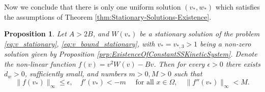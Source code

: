 \documentclass[preprint,12pt]{elsarticle}
\theoremstyle{plain}
\newtheorem{prp}{Proposition}[section]
\theoremstyle{definition}
\theoremstyle{remark}
\begin{document}
Now we conclude that there is only one uniform solution $(v_*, w_*)$ which satisfies the assumptions of Theorem \ref{thm:Stationary-Solutions-Existence}.

\begin{prp}
    \label{prp:nonlinearity_f_properties_at_v_star}
    Let $A > 2B$, and $W(v_*)$ be a stationary solution of the problem \eqref{eq:v_stationary}, \eqref{eq:v_bound_stationary}, with $v_* = v_{*, 3} > 1$ being a non-zero solution given by Proposition \ref{prp:ExistenceOfConstantSSKineticSystem}. Denote the non-linear function $f(v) = v^2W(v) - Bv$. Then for every $\epsilon > 0$ there exists $d_w > 0$, sufficiently small, and numbers $m > 0, M >0$ such that
    \begin{equation}
        \label{eq:nonlinearity_f_condition_existence}
        \|f(v_*)\|_\infty \leq \epsilon, 
        \quad
        f'(v_*) < -m
        \quad
        \text{ for all }
        x \in \Omega,
        \quad
        \|f''(v_*)\|_\infty < M.
    \end{equation}
\end{prp}
\end{document}
